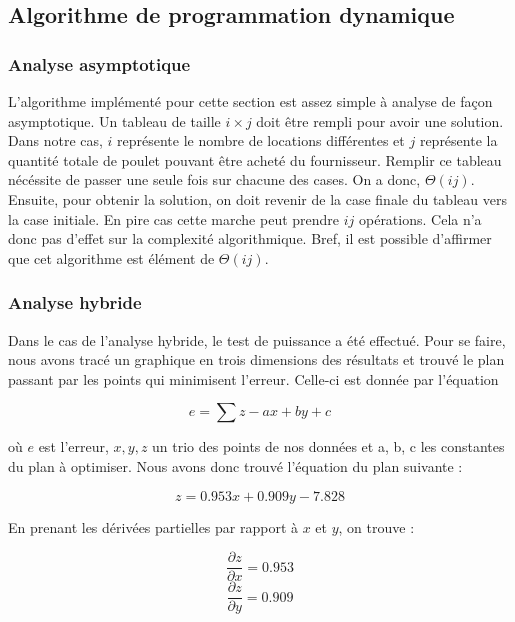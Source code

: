 \documentclass[a4paper, 12pt]{article} %
\begin{document}
\subsection*{Algorithme de programmation dynamique}
\subsubsection*{Analyse asymptotique}
    L'algorithme implémenté pour cette section est assez simple à analyse de façon
    asymptotique. Un tableau de taille $i\times j$ doit être rempli pour avoir une solution.
    Dans notre cas, $i$ représente le nombre de locations différentes et $j$ représente la quantité
    totale de poulet pouvant être acheté du fournisseur. Remplir ce tableau nécéssite de passer une seule
    fois sur chacune des cases. On a donc, $\Theta(ij)$. Ensuite, pour obtenir la solution, on doit 
    revenir de la case finale du tableau vers la case initiale. En pire cas cette marche peut prendre
    $ij$ opérations. Cela n'a donc pas d'effet sur la complexité algorithmique. Bref, il est possible 
    d'affirmer que cet algorithme est élément de $\Theta(ij)$.
\subsubsection*{Analyse hybride}
    Dans le cas de l'analyse hybride, le test de puissance a été effectué. Pour se faire,
    nous avons tracé un graphique en trois dimensions des résultats et trouvé le plan
    passant par les points qui minimisent l'erreur. Celle-ci est donnée par l'équation

    \begin{equation}
        e = \sum z - ax + by + c
    \end{equation}
    
    où $e$ est l'erreur, $x, y, z$ un trio des points de nos données et a, b, c les constantes du plan
    à optimiser. Nous avons donc trouvé l'équation du plan suivante :

    \begin{equation}
        z = 0.953x + 0.909y - 7.828
    \end{equation}

    En prenant les dérivées partielles par rapport à $x$ et $y$, on trouve : 

    \begin{equation}
        \frac{\partial z}{\partial x} = 0.953
    \end{equation}
    \begin{equation}
        \frac{\partial z}{\partial y} = 0.909
    \end{equation}
\end{document}
